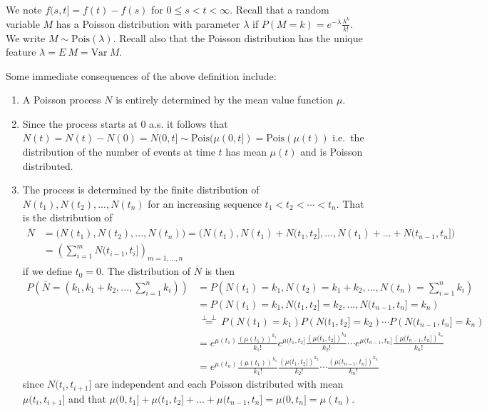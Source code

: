 \documentclass[a4paper,10pt,openany]{book}
\providecommand{\tightlist}{%
 \setlength{\itemsep}{0pt}\setlength{\parskip}{0pt}}
\begin{document}
We note \(f(s,t]=f(t)-f(s)\) for \(0\le s<t<\infty\). Recall that a random variable \(M\) has a Poisson distribution with parameter \(\lambda\) if \(P(M=k)=e^{-\lambda}\frac{\lambda^k}{k!}\). We write \(M\sim \text{Pois}(\lambda)\). Recall also that the Poisson distribution has the unique feature \(\lambda = E\ M=\text{Var}\ M\).

Some immediate consequences of the above definition include:

\begin{enumerate}
\def\labelenumi{(\arabic{enumi})}
\tightlist
\item
  A Poisson process \(N\) is entirely determined by the mean value function \(\mu\).
\item
  Since the process starts at 0 a.s. it follows that \(N(t)=N(t)-N(0)=N(0,t]\sim \text{Pois}(\mu(0,t])=\text{Pois}(\mu(t))\) i.e.~the distribution of the number of events at time \(t\) has mean \(\mu(t)\) and is Poisson distributed.
\item
  The process is determined by the finite distribution of \(N(t_1),N(t_2),...,N(t_n)\) for an increasing sequence \(t_1<t_2<\cdots <t_n\). That is the distribution of
  \begin{align*}
    \overline{N}&=\Big(N(t_1),N(t_2),...,N(t_n)\Big)=\Big(N(t_1),N(t_1)+N(t_1,t_2],...,N(t_1)+...+N(t_{n-1},t_n]\Big)\\
    &=\left(\sum_{i=1}^{m}N(t_{i-1},t_{i}]\right)_{m=1,...,n}
    \end{align*}
  if we define \(t_0=0\). The distribution of \(\overline{N}\) is then
  \begin{align*}
    P\left(\overline{N}=(k_1,k_1+k_2,...,\sum_{i=1}^nk_i)\right)&=P\left(N(t_1)=k_1,N(t_2)=k_1+k_2,...,N(t_n)=\sum_{i=1}^nk_i\right)\\
    &=P\left(N(t_1)=k_1,N(t_1,t_2]=k_2,...,N(t_{n-1},t_n]=k_n\right)\\
    &\stackrel{\perp \!\!\! \perp}{=}P\left(N(t_1)=k_1\right)P\left(N(t_1,t_2]=k_2\right)\cdots P\left(N(t_{n-1},t_n]=k_n\right)\\
    &=e^{\mu(t_1)}\frac{\left(\mu(t_1)\right)^{k_1}}{k_1!}e^{\mu(t_1,t_2]}\frac{\left(\mu(t_1,t_2]\right)^{k_2}}{k_2!}\cdots e^{\mu(t_{n-1},t_n]}\frac{\left(\mu(t_{n-1},t_n]\right)^{k_n}}{k_n!}\\
    &=e^{\mu(t_n)}\frac{\left(\mu(t_1)\right)^{k_1}}{k_1!}\frac{\left(\mu(t_1,t_2]\right)^{k_2}}{k_2!}\cdots \frac{\left(\mu(t_{n-1},t_n]\right)^{k_n}}{k_n!}
    \end{align*}
  since \(N(t_i,t_{i+1}]\) are independent and each Poisson distributed with mean \(\mu(t_i,t_{i+1}]\) and that \(\mu(0,t_1]+\mu(t_1,t_2]+...+\mu(t_{n-1},t_n]=\mu(0,t_n]=\mu(t_n)\).
\end{enumerate}
\end{document}
